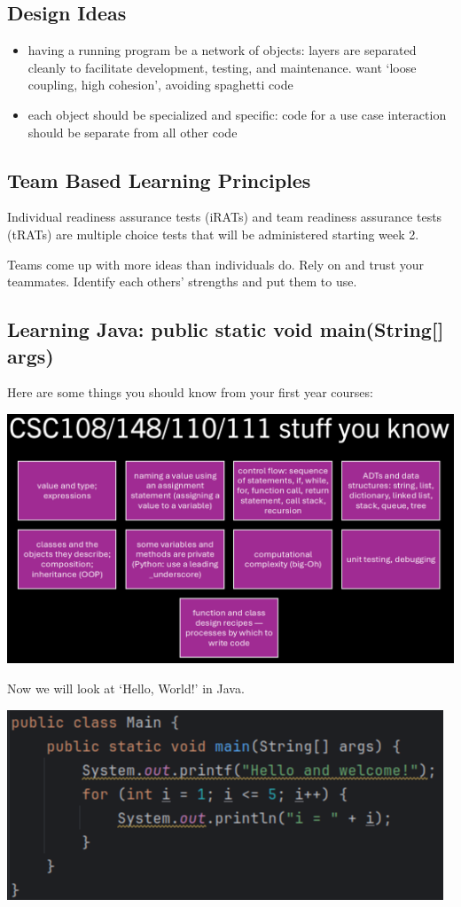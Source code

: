 \subsection{Design Ideas}
\begin{itemize}
\item having a running program be a network of objects: layers are separated cleanly to facilitate development, testing, and maintenance. want `loose coupling, high cohesion', avoiding spaghetti code
\item each object should be specialized and specific: code for a use case interaction should be separate from all other code
\end{itemize}

\subsection{Team Based Learning Principles}
Individual readiness assurance tests (iRATs) and team readiness assurance tests (tRATs) are multiple choice tests that will be administered starting week 2.

Teams come up with more ideas than individuals do. Rely on and trust your teammates. Identify each others' strengths and put them to use.

\subsection{Learning Java: public static void main(String[] args)}
Here are some things you should know from your first year courses:

\includegraphics{csc207/figures/review.jpg}

\noindent Now we will look at `Hello, World!' in Java.

\includegraphics{csc207/figures/helloworld.jpg}

